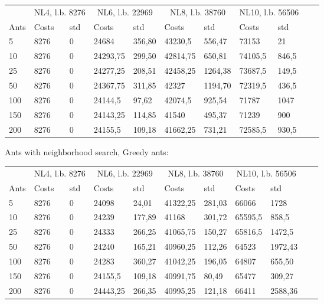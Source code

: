\begin{minipage}[b]{1.0\textwidth}
    \begin{tabular}{ l | ll | ll | ll | ll | ll}
	\hline
	& \multicolumn{2}{c}{NL4, l.b. 8276} & \multicolumn{2}{c}{NL6, l.b. 22969}
	& \multicolumn{2}{c}{NL8, l.b. 38760} & \multicolumn{2}{c}{NL10, l.b. 56506} \\
	\cline{1-9}
	Ants & Costs & std & Costs & std & Costs & std & Costs & std \\
	\hline
	5     &  8276    & 0 &  24684    & 356,80 &  43230,5    & 556,47 &  73153  &	21 \\
	10    &  8276    & 0 &  24293,75 & 299,50 &  42814,75    & 650,81 &  74105,5    & 846,5 \\
	25    &  8276    & 0 &  24277,25 & 208,51 &  42458,25    & 1264,38 &  73687,5    & 149,5 \\
	50    &  8276    & 0 &  24367,75 & 311,85 &  42327    & 1194,70 &  72319,5    & 436,5\\
	100   &  8276    & 0 &  24144,5  & 97,62  &  42074,5    & 925,54 &  71787    & 1047 \\
	150   &  8276    & 0 &  24143,25 & 114,85 &  41540    & 495,37 &  71239   & 900\\
	200   &  8276    & 0 &  24155,5  & 109,18 &  41662,25    & 731,21 &  72585,5    & 930,5\\
	\hline
	\end{tabular}
\end{minipage}
\newline
Ants with neighborhood search, Greedy ants:
\newline
\begin{minipage}[b]{1.0\textwidth}
    \begin{tabular}{ l | ll | ll | ll | ll | ll}
	\hline
	& \multicolumn{2}{c}{NL4, l.b. 8276} & \multicolumn{2}{c}{NL6, l.b. 22969}
	& \multicolumn{2}{c}{NL8, l.b. 38760} & \multicolumn{2}{c}{NL10, l.b. 56506} \\
	\cline{1-9}
	Ants & Costs & std & Costs & std & Costs & std & Costs & std \\
	\hline
	5     &  8276  & 0 &    24098   & 24,01  &  41322,25    & 281,03 &  66066   & 1728 \\
	10    &  8276  & 0 &    24239   & 177,89 &  41168       & 301,72 &  65595,5   & 858,5 \\
	25    &  8276  & 0 &    24333   & 266,25 &  41065,75    & 150,27 &  65816,5    & 1472,5 \\
	50    &  8276  & 0 &    24240   & 165,21 &  40960,25    & 112,26 &  64523    & 1972,43 \\
	100   &  8276  & 0 &    24283   & 360,27 &  41042,25    & 196,05 &  64807    & 655,50 \\
	150   &  8276  & 0 &  24155,5   & 109,18 &  40991,75    & 80,49  &  65477    & 309,27 \\
	200   &  8276  & 0 &  24443,25  & 266,35 &  40995,25    & 121,18 &  66411    & 2588,36	\\
	\hline
	\end{tabular}
\end{minipage}
